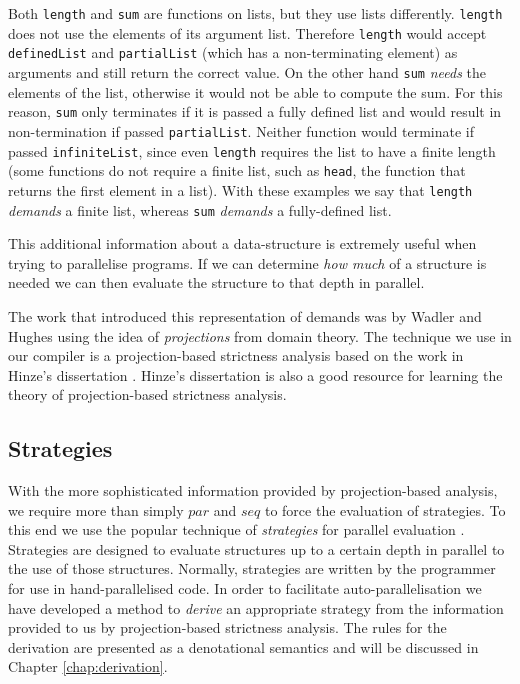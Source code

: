 Both \verb-length- and \verb-sum- are functions on lists, but they use lists
differently. \verb-length- does not use the elements of its argument list.
Therefore \verb-length- would accept \verb-definedList- and \verb-partialList-
(which has a non-terminating element) as arguments and still return the correct
value. On the other hand \verb-sum- \emph{needs} the elements of the list,
otherwise it would not be able to compute the sum. For this reason, \verb-sum-
only terminates if it is passed a fully defined list and would result in
non-termination if passed \verb-partialList-. Neither function would terminate
if passed \verb-infiniteList-, since even \verb-length- requires the list to
have a finite length (some functions do not require a finite list, such as
\verb-head-, the function that returns the first element in a list). With
these examples we say that \verb-length- \emph{demands} a finite list, whereas
\verb-sum- \emph{demands} a fully-defined list.

This additional information about a data-structure is extremely useful when
trying to parallelise programs. If we can determine \emph{how much} of a
structure is needed we can then evaluate the structure to that depth in
parallel.


The work that introduced this representation of demands was by Wadler and
Hughes \citep{wadler1987projections} using the idea of \emph{projections} from
domain theory.  The technique we use in our compiler is a projection-based
strictness analysis based on the work in Hinze's dissertation
\citep{hinze1995projection}.  Hinze's dissertation is also a good resource for
learning the theory of projection-based strictness analysis.


\subsection*{Strategies}

With the more sophisticated information provided by projection-based analysis,
we require more than simply $par$ and $seq$ to force the evaluation of
strategies. To this end we use the popular technique of \emph{strategies} for
parallel evaluation \citep{strategies, marlow2010seq}. Strategies are designed
to evaluate structures up to a certain depth in parallel to the use of those
structures. Normally, strategies are written by the programmer for use in
hand-parallelised code. In order to facilitate auto-parallelisation we have
developed a method to \emph{derive} an appropriate strategy from the
information provided to us by projection-based strictness analysis. The rules
for the derivation are presented as a denotational semantics and will be discussed
in Chapter \ref{chap:derivation}.
